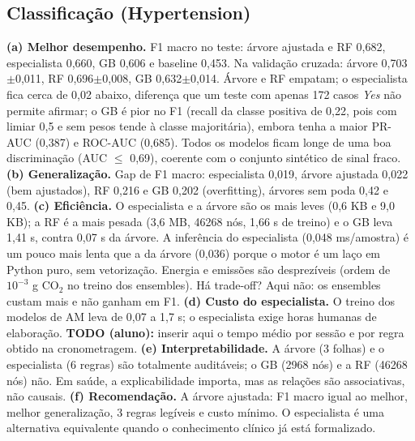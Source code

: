 \documentclass[11pt,a4paper]{article}
\begin{document}
\subsection*{Classificação (Hypertension)}
\textbf{(a) Melhor desempenho.} F1 macro no teste: árvore ajustada e RF 0,682, especialista 0,660, GB 0,606 e baseline 0,453.
Na validação cruzada: árvore 0,703$\pm$0,011, RF 0,696$\pm$0,008, GB 0,632$\pm$0,014. Árvore e RF empatam; o especialista fica cerca de 0,02 abaixo, diferença que um teste com apenas 172 casos \emph{Yes} não permite afirmar; o GB é pior no F1 (recall da classe positiva de 0,22, pois com limiar 0,5 e sem pesos tende à classe majoritária), embora tenha a maior PR-AUC (0,387) e ROC-AUC (0,685). Todos os modelos ficam longe de uma boa discriminação (AUC $\le$ 0,69), coerente com o conjunto sintético de sinal fraco.
\textbf{(b) Generalização.} Gap de F1 macro: especialista 0,019, árvore ajustada 0,022 (bem ajustados), RF 0,216 e GB 0,202 (overfitting), árvores sem poda 0,42 e 0,45.
\textbf{(c) Eficiência.} O especialista e a árvore são os mais leves (0,6 KB e 9,0 KB); a RF é a mais pesada (3,6 MB, 46268 nós, 1,66 s de treino) e o GB leva 1,41 s, contra 0,07 s da árvore.
A inferência do especialista (0,048 ms/amostra) é um pouco mais lenta que a da árvore (0,036) porque o motor é um laço em Python puro, sem vetorização. Energia e emissões são desprezíveis (ordem de $10^{-3}$ g CO$_2$ no treino dos ensembles). Há trade-off? Aqui não: os ensembles custam mais e não ganham em F1.
\textbf{(d) Custo do especialista.} O treino dos modelos de AM leva de 0,07 a 1,7 s; o especialista exige horas humanas de elaboração. \textbf{TODO (aluno):} inserir aqui o tempo médio por sessão e por regra obtido na cronometragem.
\textbf{(e) Interpretabilidade.} A árvore (3 folhas) e o especialista (6 regras) são totalmente auditáveis; o GB (2968 nós) e a RF (46268 nós) não. Em saúde, a explicabilidade importa, mas as relações são associativas, não causais.
\textbf{(f) Recomendação.} A árvore ajustada: F1 macro igual ao melhor, melhor generalização, 3 regras legíveis e custo mínimo. O especialista é uma alternativa equivalente quando o conhecimento clínico já está formalizado.
\end{document}
